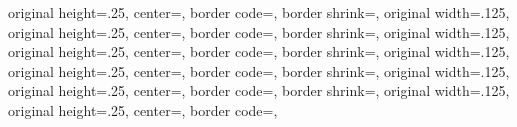 {{	original height=.25\pgfpageoptionwidth,%
	center=\pgfpoint{.25\pgfphysicalwidth}{.25\pgfphysicalheight},%
	border code=\pgfsetlinewidth{.5pt}\pgfstroke,%
  }%
  {%
	border shrink=\pgfpageoptionborder,%
	original width=.125\pgfpageoptionheight,%
	original height=.25\pgfpageoptionwidth,%
	center=\pgfpoint{0pt}{.25\pgfphysicalheight},%
	border code=\pgfsetlinewidth{.5pt}\pgfstroke,%
  }%
  {%
	border shrink=\pgfpageoptionborder,%
	original width=.125\pgfpageoptionheight,%
	original height=.25\pgfpageoptionwidth,%
	center=\pgfpoint{.75\pgfphysicalwidth}{.125\pgfphysicalheight},%
	border code=\pgfsetlinewidth{.5pt}\pgfstroke,%
  }%
  {%
	border shrink=\pgfpageoptionborder,%
	original width=.125\pgfpageoptionheight,%
	original height=.25\pgfpageoptionwidth,%
	center=\pgfpoint{.5\pgfphysicalwidth}{.125\pgfphysicalheight},%
	border code=\pgfsetlinewidth{.5pt}\pgfstroke,%
	}%
  {%
	border shrink=\pgfpageoptionborder,%
	original width=.125\pgfpageoptionheight,%
	original height=.25\pgfpageoptionwidth,%
	center=\pgfpoint{.25\pgfphysicalwidth}{.125\pgfphysicalheight},%
	border code=\pgfsetlinewidth{.5pt}\pgfstroke,%
  }%
  {%
	border shrink=\pgfpageoptionborder,%
	original width=.125\pgfpageoptionheight,%
	original height=.25\pgfpageoptionwidth,%
	center=\pgfpoint{0pt}{.125\pgfphysicalheight},%
	border code=\pgfsetlinewidth{.5pt}\pgfstroke,%
  }%
}%